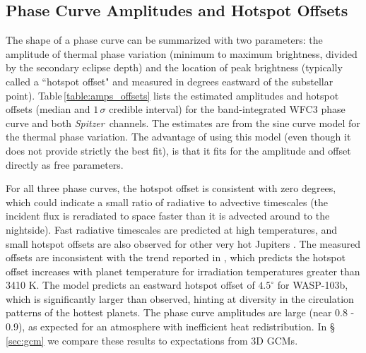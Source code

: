 \documentclass[twocolumn, trackchanges]{aastex61}
\newcommand{\project}[1]{\textsl{#1}}
\newcommand{\Spitzer}{\project{Spitzer}}
\begin{document}
\subsection{Phase Curve Amplitudes and Hotspot Offsets}
The shape of a phase curve can be summarized with two parameters: the amplitude of thermal phase variation (minimum to maximum brightness, divided by the secondary eclipse depth) and the location of peak brightness (typically called a ``hotspot offset" and measured in degrees eastward of the substellar point).  Table\,\ref{table:amps_offsets} lists the estimated amplitudes and hotspot offsets (median and $1\,\sigma$ credible interval) for the band-integrated WFC3 phase curve and both \Spitzer\ channels. The estimates are from the sine curve model for the thermal phase variation. The advantage of using this model (even though it does not provide strictly the best fit), is that it fits for the amplitude and offset directly as free parameters. 


For all three phase curves, the hotspot offset is consistent with zero degrees, which could indicate a small ratio of radiative to advective timescales (the incident flux is reradiated to space faster than it is advected around to the nightside). Fast radiative timescales are predicted at high temperatures, and small hotspot offsets are also observed for other very hot Jupiters \citep{perez13, komacek16, komacek17}.  The measured offsets are inconsistent with the trend reported in \cite{zhang17}, which predicts the hotspot offset increases with planet temperature for irradiation temperatures greater than 3410 K. The \cite{zhang17} model predicts an eastward hotspot offset of $4.5^\circ$ for WASP-103b, which is significantly larger than observed, hinting at diversity in the circulation patterns of the hottest planets.  The phase curve amplitudes are large (near 0.8 - 0.9), as expected for an atmosphere with inefficient heat redistribution. In \S\,\ref{sec:gcm} we compare these results to expectations from 3D GCMs.

\end{document}
